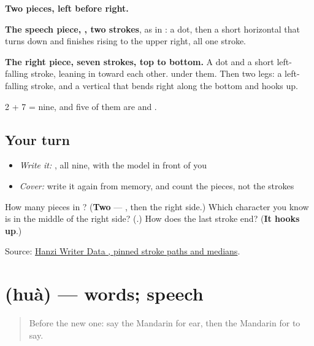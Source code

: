 \begin{quote}
\end{quote}

\textbf{Two pieces, left before right.}

\textbf{The speech piece, , two strokes}, as in : a dot, then a short horizontal that turns down and finishes rising to the upper right, all one stroke.

\textbf{The right piece, seven strokes, top to bottom.} A dot and a short left-falling stroke, leaning in toward each other.  under them. Then two legs: a left-falling stroke, and a vertical that bends right along the bottom and hooks up.

2 + 7 = nine, and five of them are  and .

\subsection*{Your turn}
\begin{itemize}
\raggedright
  \item \emph{Write it:} , all nine, with the model in front of you
  \item \emph{Cover:} write it again from memory, and count the pieces, not the strokes
\end{itemize}

\begin{tcolorbox}[breakable,colback=teal!4,colframe=teal!35!black,title={Before you move on}]
How many pieces in ? (\textbf{Two} — , then the right side.) Which character you know is in the middle of the right side? (\textbf{}.) How does the last stroke end? (\textbf{It hooks up}.)

Source: \href{https://raw.githubusercontent.com/chanind/hanzi-writer-data/68d10a4b21150cae5e1ebbd223eed289cf32d90c/data/\%E8\%AF\%B4.json}{Hanzi Writer Data , pinned stroke paths and medians}.
\end{tcolorbox}
\section[\texorpdfstring{\zh{话} (huà)}{话 (huà)}]{ (huà) — words; speech}

\label{lesson:ZH-C53-hua}



\begin{quote}
Before the new one: say the Mandarin for ear, then the Mandarin for to say.
\end{quote}

